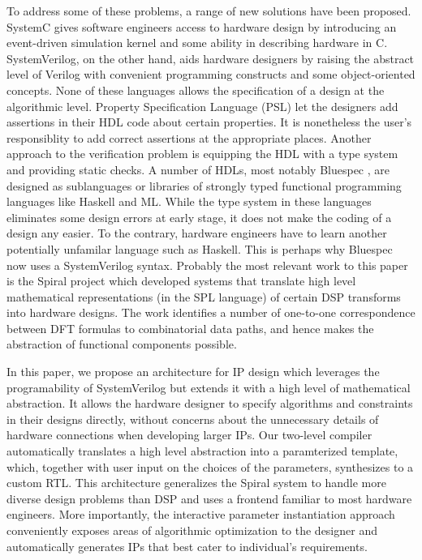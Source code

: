 To address some of these problems, a range of new solutions have been
proposed. 
SystemC gives software engineers access to hardware design by 
introducing an event-driven simulation
kernel and some ability in describing hardware in C. 
SystemVerilog, on the other hand, aids hardware designers by raising 
the abstract level of Verilog with convenient programming constructs and 
some object-oriented concepts. None of these
languages allows the specification of a design at the algorithmic level. 
Property Specification Language (PSL) let the designers 
add assertions in their HDL code about certain properties. 
It is nonetheless the user's responsiblity to add correct assertions
at the appropriate places. Another approach to the verification
problem is equipping the HDL with a type system and providing static checks.
A number of HDLs, most notably Bluespec \cite{Arvind03:bluespec}, 
are designed as sublanguages or 
libraries of strongly typed functional programming languages like Haskell and ML. 
While the type system in these languages eliminates some design errors at early stage,
it does not make the coding of a design any easier. To the contrary, hardware
engineers have to learn another potentially unfamilar language such as Haskell.
This is perhaps why Bluespec now uses a SystemVerilog syntax.
Probably the most relevant work to this paper is the Spiral project \cite{NordinMHP05:Spiral}
which developed systems that translate high level mathematical representations 
(in the SPL language) 
of certain DSP transforms into hardware designs. 
The work identifies a number of one-to-one correspondence between DFT formulas to 
combinatorial data paths, and hence makes the abstraction of functional components possible. 

In this paper, we propose an architecture for IP design which leverages the 
programability of SystemVerilog but extends it with a high level of mathematical abstraction. 
It allows the hardware designer to specify algorithms and constraints in their designs directly,
without concerns about the unnecessary details of hardware connections when developing larger
IPs. Our two-level compiler automatically translates a high level abstraction into 
a paramterized template, which, together with user input on the choices of the parameters, 
synthesizes to a custom RTL. This architecture generalizes the Spiral system to handle more
diverse design problems than DSP and uses a frontend familiar to most
hardware engineers. More importantly, the interactive parameter instantiation approach
conveniently exposes areas of algorithmic optimization to the designer and automatically
generates IPs that best cater to individual's requirements.

